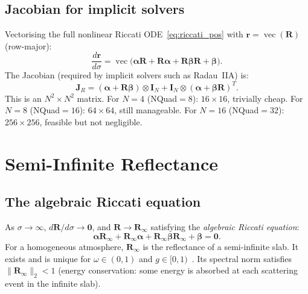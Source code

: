 \documentclass[11pt,a4paper]{article}
\newcommand{\vect}[1]{\bm{#1}}
\newcommand{\mat}[1]{\mathbf{#1}}
\newcommand{\Rinf}{\mat{R}_\infty}
\theoremstyle{definition}
\begin{document}
\subsection{Jacobian for implicit solvers}

Vectorising the full nonlinear Riccati
ODE~\eqref{eq:riccati_pos} with
$\vect{r}=\operatorname{vec}(\mat{R})$ (row-major):
\begin{equation}\label{eq:riccati_vec}
  \frac{d\vect{r}}{d\sigma}
  = \operatorname{vec}\bigl(
    \mat{\alpha}\mat{R} + \mat{R}\mat{\alpha}
    + \mat{R}\mat{\beta}\mat{R} + \mat{\beta}
  \bigr).
\end{equation}
The Jacobian (required by implicit solvers such as Radau~IIA) is:
\begin{equation}\label{eq:jac_riccati}
  \mat{J}_R
  = (\mat{\alpha}+\mat{R}\mat{\beta})\otimes\mat{I}_N
  + \mat{I}_N\otimes(\mat{\alpha}+\mat{\beta}\mat{R})^T.
\end{equation}
This is an $N^2\!\times\!N^2$ matrix.  For $N=4$ (NQuad${}=8$):
$16\times 16$, trivially cheap.  For $N=8$ (NQuad${}=16$):
$64\times 64$, still manageable.  For $N=16$ (NQuad${}=32$):
$256\times 256$, feasible but not negligible.


\section{Semi-Infinite Reflectance}\label{sec:R_inf}

\subsection{The algebraic Riccati equation}

As $\sigma\to\infty$, $d\mat{R}/d\sigma\to\mat{0}$, and
$\mat{R}\to\Rinf$ satisfying the \emph{algebraic Riccati equation}:
\begin{equation}\label{eq:ARE}
  \mat{\alpha}\Rinf + \Rinf\mat{\alpha}
  + \Rinf\mat{\beta}\Rinf + \mat{\beta} = \mat{0}.
\end{equation}
For a homogeneous atmosphere, $\Rinf$ is the reflectance of a
semi-infinite slab.  It exists and is unique for $\omega\in(0,1)$
and $g\in[0,1)$~\cite{bittanti1991,lancaster1995}.  Its spectral norm satisfies
$\|\Rinf\|_2 < 1$ (energy conservation: some energy is absorbed at
each scattering event in the infinite slab).
\end{document}

